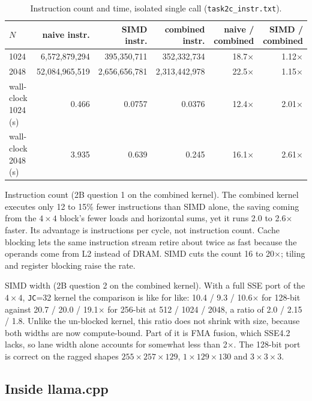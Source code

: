 \documentclass[11pt,a4paper]{article}
\begin{document}
\begin{table}[H]
\centering\small
\caption{Instruction count and time, isolated single call (\texttt{task2c\_instr.txt}).}
\setlength{\tabcolsep}{3.5pt}\scriptsize
\begin{tabular}{l rrr rr}
\toprule
$N$ & naive instr. & SIMD instr. & combined instr. & naive / combined & SIMD / combined \\
\midrule
1024 & 6,572,879,294 & 395,350,711 & 352,332,734 & 18.7$\times$ & 1.12$\times$ \\
2048 & 52,084,965,519 & 2,656,656,781 & 2,313,442,978 & 22.5$\times$ & 1.15$\times$ \\
\midrule
wall-clock 1024 (s) & 0.466 & 0.0757 & 0.0376 & 12.4$\times$ & 2.01$\times$ \\
wall-clock 2048 (s) & 3.935 & 0.639 & 0.245 & 16.1$\times$ & 2.61$\times$ \\
\bottomrule
\end{tabular}
\end{table}

Instruction count (2B question 1 on the combined kernel). The combined kernel executes only 12 to 15\% fewer instructions than SIMD alone, the saving coming from the $4\times4$ block's fewer loads and horizontal sums, yet it runs 2.0 to 2.6$\times$ faster. Its advantage is instructions per cycle, not instruction count. Cache blocking lets the same instruction stream retire about twice as fast because the operands come from L2 instead of DRAM. SIMD cuts the count 16 to 20$\times$; tiling and register blocking raise the rate.

SIMD width (2B question 2 on the combined kernel). With a full SSE port of the $4\times4$, \texttt{JC}=32 kernel the comparison is like for like: 10.4 / 9.3 / 10.6$\times$ for 128-bit against 20.7 / 20.0 / 19.1$\times$ for 256-bit at 512 / 1024 / 2048, a ratio of 2.0 / 2.15 / 1.8. Unlike the un-blocked kernel, this ratio does not shrink with size, because both widths are now compute-bound. Part of it is FMA fusion, which SSE4.2 lacks, so lane width alone accounts for somewhat less than 2$\times$. The 128-bit port is correct on the ragged shapes $255\times257\times129$, $1\times129\times130$ and $3\times3\times3$.

\subsection{Inside llama.cpp}
\end{document}
